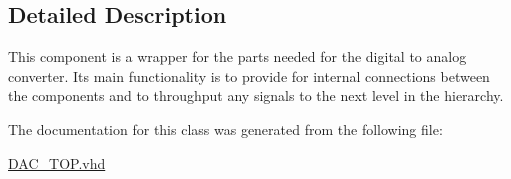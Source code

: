 \subsection{Detailed Description}
This component is a wrapper for the parts needed for the digital to analog converter. Its main functionality is to provide for internal connections between the components and to throughput any signals to the next level in the hierarchy. 

The documentation for this class was generated from the following file\-:\begin{DoxyCompactItemize}
\item 
\hyperlink{DAC__TOP_8vhd}{D\-A\-C\-\_\-\-T\-O\-P.\-vhd}\end{DoxyCompactItemize}
